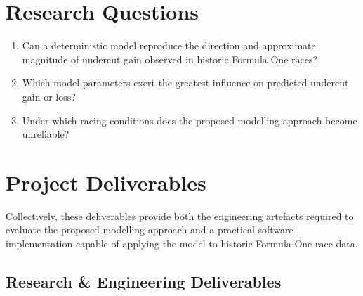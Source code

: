 \section{Research Questions}
\label{sec:research-questions}


\begin{enumerate}[label=\textbf{RQ\arabic*:}]
    \item Can a deterministic model reproduce the direction and approximate magnitude of undercut gain observed in historic Formula One races?
    \item Which model parameters exert the greatest influence on predicted undercut gain or loss?
    \item Under which racing conditions does the proposed modelling approach become unreliable?
\end{enumerate}

\section{Project Deliverables}
\label{sec:deliverables}

%
%
%

Collectively, these deliverables provide both the engineering artefacts
required to evaluate the proposed modelling approach and a practical
software implementation capable of applying the model to historic Formula
One race data.

\subsection{Research \& Engineering Deliverables}
\label{subsec:research-deliberables}

